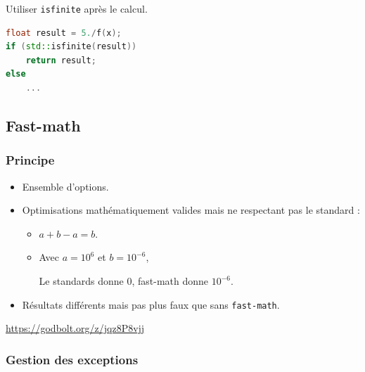 \documentclass{beamer}
\begin{document}
\begin{frame}[fragile]
    Utiliser \verb'isfinite' après le calcul.

    \begin{lstlisting}[language=c++]
float result = 5./f(x);
if (std::isfinite(result))
    return result;
else
    ...
    \end{lstlisting}
\end{frame}

\subsection{Fast-math}

\begin{frame}[fragile]
    \frametitle{Principe}

    \begin{itemize}
        \item Ensemble d'options.
        \item Optimisations mathématiquement valides mais ne respectant pas le standard :
              \begin{itemize}
                  \item $a+b-a = b$.
                  \item Avec $a = 10^6$ et $b = 10^{-6}$,

                        Le standards donne $0$, fast-math donne $10^{-6}$.
              \end{itemize}
        \item Résultats différents mais pas plus faux que sans \verb'fast-math'.
    \end{itemize}

    \url{https://godbolt.org/z/jqz8P8vjj}
\end{frame}

\subsubsection{Gestion des exceptions}
\end{document}
